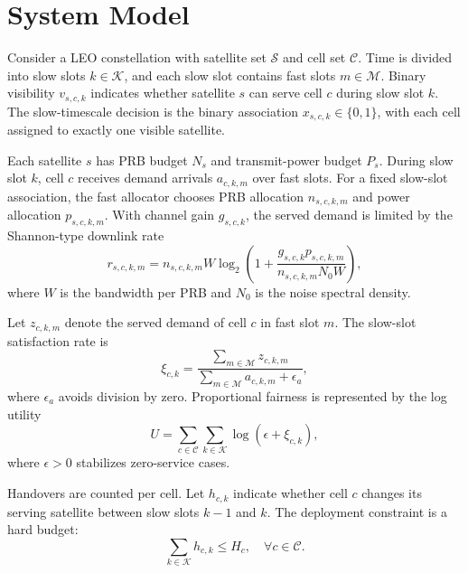 
\section{System Model}

Consider a LEO constellation with satellite set $\mathcal{S}$ and cell set
$\mathcal{C}$. Time is divided into slow slots $k \in \mathcal{K}$, and each
slow slot contains fast slots $m \in \mathcal{M}$. Binary visibility
$v_{s,c,k}$ indicates whether satellite $s$ can serve cell $c$ during slow slot
$k$. The slow-timescale decision is the binary association
$x_{s,c,k} \in \{0,1\}$, with each cell assigned to exactly one visible
satellite.

Each satellite $s$ has PRB budget $N_s$ and transmit-power budget $P_s$. During
slow slot $k$, cell $c$ receives demand arrivals $a_{c,k,m}$ over fast slots.
For a fixed slow-slot association, the fast allocator chooses PRB allocation
$n_{s,c,k,m}$ and power allocation $p_{s,c,k,m}$. With channel gain
$g_{s,c,k}$, the served demand is limited by the Shannon-type downlink rate
\begin{equation}
    r_{s,c,k,m}
    =
    n_{s,c,k,m} W
    \log_2 \left(1 +
    \frac{g_{s,c,k} p_{s,c,k,m}}
    {n_{s,c,k,m} N_0 W}
    \right),
\end{equation}
where $W$ is the bandwidth per PRB and $N_0$ is the noise spectral density.

Let $z_{c,k,m}$ denote the served demand of cell $c$ in fast slot $m$. The
slow-slot satisfaction rate is
\begin{equation}
    \xi_{c,k}
    =
    \frac{\sum_{m \in \mathcal{M}} z_{c,k,m}}
    {\sum_{m \in \mathcal{M}} a_{c,k,m} + \epsilon_a},
\end{equation}
where $\epsilon_a$ avoids division by zero. Proportional fairness is represented
by the log utility
\begin{equation}
    U = \sum_{c \in \mathcal{C}} \sum_{k \in \mathcal{K}}
    \log(\epsilon + \xi_{c,k}),
\end{equation}
where $\epsilon > 0$ stabilizes zero-service cases.

Handovers are counted per cell. Let $h_{c,k}$ indicate whether cell $c$ changes
its serving satellite between slow slots $k-1$ and $k$. The deployment
constraint is a hard budget:
\begin{equation}
    \sum_{k \in \mathcal{K}} h_{c,k} \leq H_c,\quad \forall c \in \mathcal{C}.
\end{equation}
